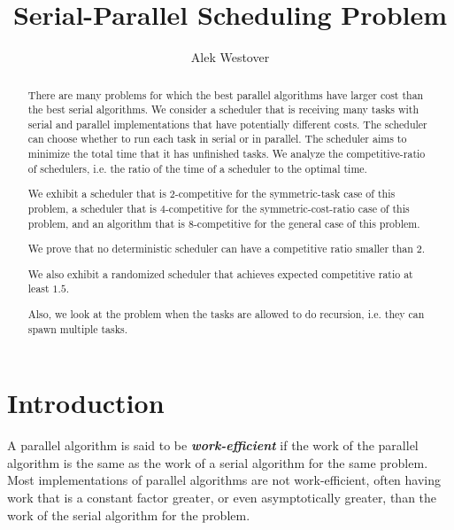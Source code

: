 \documentclass[twocolumn]{article}[11pt]
\author{Alek Westover}
\title{Serial-Parallel Scheduling Problem}
\newcommand{\defn}[1]{{\textit{\textbf{\boldmath #1}}}\xspace}
\begin{document}
\maketitle

\begin{abstract}
  There are many problems for which the best parallel algorithms
  have larger cost than the best serial algorithms. 
  We consider a scheduler that is receiving many tasks with
  serial and parallel implementations that have potentially
  different costs. The scheduler can choose whether to run each
  task in serial or in parallel.
  The scheduler aims to minimize the total time that it has
  unfinished tasks. We analyze the competitive-ratio of
  schedulers, i.e. the ratio of the time of a scheduler to the
  optimal time.

  We exhibit a scheduler that is $2$-competitive for the
  symmetric-task case of this problem, a scheduler that is
  $4$-competitive for the symmetric-cost-ratio case of this
  problem, and an algorithm that is $8$-competitive for the
  general case of this problem.

  We prove that no deterministic scheduler can have a competitive
  ratio smaller than $2$.

  We also exhibit a randomized scheduler that achieves
  expected competitive ratio at least $1.5$.

  Also, we look at the problem when the tasks are allowed to do
  recursion, i.e. they can spawn multiple tasks.

\end{abstract}

\section{Introduction}
A parallel algorithm is said to be \defn{work-efficient} if the
work of the parallel algorithm is the same as the work of a
serial algorithm for the same problem. Most implementations of
parallel algorithms are not work-efficient, often having work
that is a constant factor greater, or even asymptotically
greater, than the work of the serial algorithm for the problem.
\end{document}
